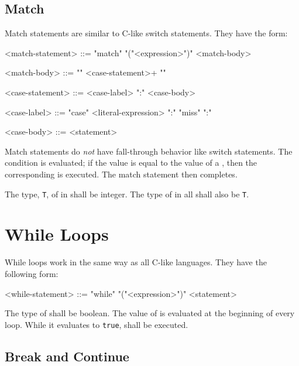 \subsection{Match}

Match statements are similar to C-like switch statements. They have the form:

\begin{minip}
\begin{grammar}
<match-statement> ::= "match" "("<expression>")" <match-body>

<match-body> ::= "{" <case-statement>+ "}"

<case-statement> ::= <case-label> ":" <case-body>

<case-label> ::= 
"case" <literal-expression> ":"
\alt "miss" ":"

<case-body> ::= <statement> 
\end{grammar}
\end{minip}

Match statements do \textit{not} have fall-through behavior like switch statements. The condition  is evaluated; if the value is equal to the value of a , then the corresponding  is executed. The match statement then completes.

The type, \texttt{T}, of  in  shall be integer. The type of  in all  shall also be \texttt{T}.

\section{While Loops} \label{guide:while_stmt}

While loops work in the same way as all C-like languages. They have the following form:

\begin{minip}
\begin{grammar}
<while-statement> ::= "while" "("<expression>")" <statement>
\end{grammar}
\end{minip}

The type of  shall be boolean. The value of  is evaluated at the beginning of every loop. While it evaluates to \texttt{true},  shall be executed. 

\subsection{Break and Continue} \label{guide:break_continue}

